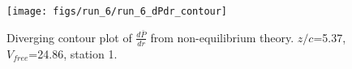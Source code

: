 \begin{figure}[H]
\centering
\texttt{[image: figs/run\_6/run\_6\_dPdr\_contour]}
\caption{Diverging contour plot of $\frac{d\bar{P}}{dr}$ from non-equilibrium theory. $z/c$=5.37, $V_{free}$=24.86, station 1.}
\label{fig:run_6_dPdr_contour}
\end{figure}


